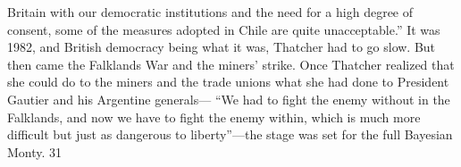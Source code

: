 Britain with our democratic institutions and the need for a high degree of consent, some of the measures adopted in Chile are quite unacceptable.” It was 1982, and British democracy being what it was, Thatcher had to go slow. But then came the Falklands War and the miners’ strike. Once Thatcher realized that she could do to the miners and the trade unions what she had done to President Gautier and his Argentine generals— “We had to fight the enemy without in the Falklands, and now we have to fight the enemy within, which is much more difficult but just as dangerous to liberty”—the stage was set for the full Bayesian Monty. 31{\par}